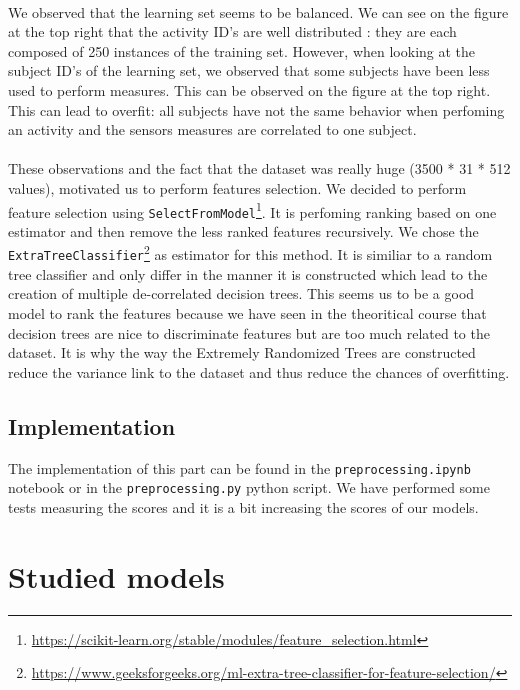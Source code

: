 \documentclass[a4paper, 11pt, oneside]{article}
\begin{document}
\paragraph{}We observed that the learning set seems to be balanced. We can see on the figure at the top right that the activity ID's are well distributed : they are each composed of 250 instances of the training set. However, when looking at the subject ID's of the learning set, we observed that some subjects have been less used to perform measures. This can be observed on the figure at the top right.
This can lead to overfit: all subjects have not the same behavior when perfoming an activity and the sensors measures are correlated to one subject.

\paragraph{}These observations and the fact that the dataset was really huge (3500 * 31 * 512 values), motivated us to perform features selection. We decided to perform feature selection using \texttt{SelectFromModel}\footnote{\url{https://scikit-learn.org/stable/modules/feature_selection.html}}. It is perfoming ranking based on one estimator and then remove the less ranked features recursively. We chose the \texttt{ExtraTreeClassifier}\footnote{\url{https://www.geeksforgeeks.org/ml-extra-tree-classifier-for-feature-selection/}} as estimator for this method. It is similiar to a random tree classifier and only differ in the manner it is constructed which lead to the creation of multiple de-correlated decision trees. This seems us to be a good model to rank the features because we have seen in the theoritical course that decision trees are nice to discriminate features but are too much related to the dataset. It is why the way the Extremely Randomized Trees are constructed reduce the variance link to the dataset and thus reduce the chances of overfitting.

\subsection{Implementation}

The implementation of this part can be found in the \texttt{preprocessing.ipynb} notebook or in the \texttt{preprocessing.py} python script. We have performed some tests measuring the scores and it is a bit increasing the scores of our models.

\section{Studied models}
\end{document}
